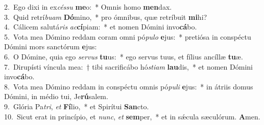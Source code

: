 {2.~}Ego dixi in ex\textit{cés}\textit{su} \textbf{me}o:~* Omnis homo \textbf{men}dax.\\
{3.~}Quid retrí\textit{bu}\textit{am} \textbf{Dó}mino,~* pro ómnibus, quæ retríbuit \textbf{mi}hi?\\
{4.~}Cálicem salutá\textit{ris} \textit{ac}\textbf{cí}piam:~* et nomen Dómini invo\textbf{cá}bo.\\
{5.~}Vota mea Dómino reddam coram omni pó\textit{pu}\textit{lo} \textbf{e}jus:~* pretiósa in conspéctu Dómini mors sanctórum \textbf{e}jus:\\
{6.~}O Dómine, quia ego \textit{ser}\textit{vus} \textbf{tu}us:~* ego servus tuus, et fílius ancíllæ \textbf{tu}æ.\\
{7.~}Dirupísti víncula mea:~† tibi sacrificábo hó\textit{sti}\textit{am} \textbf{lau}dis,~* et nomen Dómini invo\textbf{cá}bo.\\
{8.~}Vota mea Dómino reddam in conspéctu omnis pó\textit{pu}\textit{li} \textbf{e}jus:~* in átriis domus Dómini, in médio tui, Je\textbf{rú}salem.\\
{9.~}Glória Pa\textit{tri}, \textit{et} \textbf{Fí}lio,~* et Spirítui \textbf{San}cto.\\
{10.~}Sicut erat in princípio, et \textit{nunc}, \textit{et} \textbf{sem}per,~* et in sǽcula sæculórum. \textbf{A}men.\\
